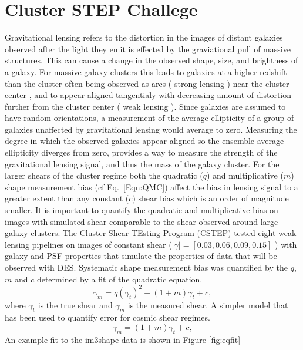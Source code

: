 \documentclass[useAMS,usenatbib]{mn2e}
\begin{document}
\section{Cluster STEP Challege}
Gravitational lensing refers to the distortion in the images of
distant galaxies observed after the light they emit is
effected by the graviational pull of massive structures. This can
cause a change in the observed shape, size, and brightness of a
galaxy. For massive galaxy clusters this leads to galaxies at a
higher redshift than the cluster often being
observed as arcs ( strong lensing ) near the cluster center , and to
appear aligned tangentialy with decreasing amount of distortion further from
the cluster center ( weak lensing ). Since galaxies are assumed to
have random orientations, a measurement of the average ellipticity of
a group of galaxies unaffected by gravitational lensing would average
to zero. Measuring the degree in which the observed galaxies appear aligned so
the ensemble average ellipticity diverges from zero, provides a way to 
measure the strength of the gravitational lensing signal, and thus the
mass of the galaxy cluster. 
\indent For the
larger shears of the cluster regime both the quadratic ($q$) and
multiplicative ($m$) shape measurement bias (cf Eq.~\ref{Eqn:QMC})
affect the bias in lensing signal to a greater extent than any
constant ($c$) shear bias which is an order of magnitude smaller. It is
important to quantify the quadratic and multiplicative bias on images
with simulated shear comparable to the shear observed around large
galaxy clusters. The Cluster Shear TEsting Program (CSTEP) tested eight weak lensing pipelines on images of constant shear
($|\gamma| = [0.03, 0.06, 0.09, 0.15]$ ) with galaxy and PSF properties that simulate the properties
of data that will be observed with DES. Systematic shape measurement bias was quantified by the $q$, $m$ and $c$
determined by a fit of the quadratic equation.
\begin{equation}\label{Eqn:QMC}
\gamma_m = q (\gamma_t)^2 + (1+m) \gamma_t + c,
\end {equation}
where $\gamma_t$ is the true shear and $\gamma_m$ is the measured
shear. A simpler model that has been used to quantify error
for cosmic shear regimes.
\begin{equation}\label{Eqn:MC}
\gamma_m = (1+m) \gamma_t + c,
\end {equation}
An example fit to the im3shape data is shown in Figure \ref{fig:eqfit}
\end{document}
